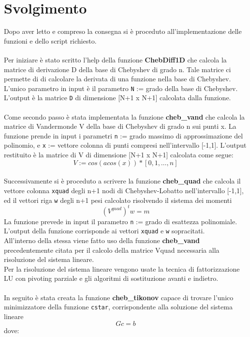 \documentclass{article}
\begin{document}
\clearpage

\section{Svolgimento}
Dopo aver letto e compreso la consegna si è proceduto all'implementazione delle funzioni e dello script richiesto.\\\\
Per iniziare è stato scritto l'help della funzione \textbf{ChebDiff1D} che calcola la matrice di derivazione D della base di Chebyshev di grado n. Tale matrice ci permette di di calcolare la derivata di una funzione nella base di Chebyshev. L'unico parametro in input è il parametro \texttt{N} := grado della base di Chebyshev. L'output è la matrice \texttt{D} di dimensione [N+1 x N+1] calcolata dalla funzione.\\\\
Come secondo passo è stata implementata la funzione \textbf{cheb\_vand} che calcola la matrice di Vandermonde V della base di Chebyshev di grado n sui punti x. La funzione prende in input i parametri \texttt{n} := grado massimo di approssimazione del polinomio, e \texttt{x} := vettore colonna di punti compresi nell'intervallo [-1,1]. L'output restituito è la matrice di V di dimensione [N+1 x N+1] calcolata come segue:
\[V := cos(acos(x))*[0,1,\dots,n]\]\\
Successivamente si è proceduto a scrivere la funzione \textbf{cheb\_quad} che calcola il vettore colonna \texttt{xquad} degli n+1 nodi di Chebyshev-Lobatto nell'intervallo [-1,1], ed il vettori riga \texttt{w} degli n+1 pesi calcolato risolvendo il sistema dei momenti
\[(V^{quad})^{t}w=m\]
La funzione prevede in input il parametro \texttt{n} := grado di esattezza polinomiale. L'output della funzione corrisponde ai vettori \texttt{xquad} e \texttt{w} sopracitati.\\
All'interno della stessa viene fatto uso della funzione \textbf{cheb\_vand} precedentemente citata per il calcolo della matrice Vquad necessaria alla risoluzione del sistema lineare.\\
Per la risoluzione del sistema lineare vengono usate la tecnica di fattorizzazione LU con pivoting parziale e gli algoritmi di sostituzione avanti e indietro.\\\\
In seguito è stata creata la funzione \textbf{cheb\_tikonov} capace di trovare l'unico minimizzatore della funzione \texttt{cstar}, corrispondente alla soluzione del sistema lineare 
\[Gc=b\]
dove:
\end{document}
